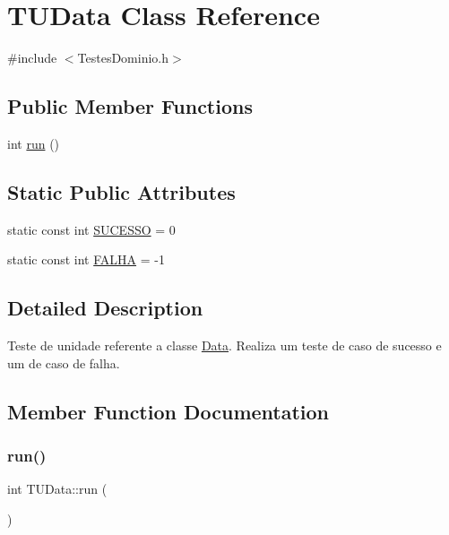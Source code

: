 \hypertarget{class_t_u_data}{}\section{T\+U\+Data Class Reference}
\label{class_t_u_data}


{\ttfamily \#include $<$Testes\+Dominio.\+h$>$}

\subsection*{Public Member Functions}
\begin{DoxyCompactItemize}
\item 
int \hyperlink{class_t_u_data_a4fd95b821fa6d55bdc82be6f3a3cbef2}{run} ()
\end{DoxyCompactItemize}
\subsection*{Static Public Attributes}
\begin{DoxyCompactItemize}
\item 
static const int \hyperlink{class_t_u_data_a59be2c38007b733030111a5aadfb4517}{S\+U\+C\+E\+S\+SO} = 0
\item 
static const int \hyperlink{class_t_u_data_a691cfac8c7fc4b3da149ef868de44f35}{F\+A\+L\+HA} = -\/1
\end{DoxyCompactItemize}


\subsection{Detailed Description}
Teste de unidade referente a classe \hyperlink{class_data}{Data}. Realiza um teste de caso de sucesso e um de caso de falha. 

\subsection{Member Function Documentation}
\mbox{\label{class_t_u_data_a4fd95b821fa6d55bdc82be6f3a3cbef2}} 
\subsubsection{\texorpdfstring{run()}{run()}}
{\footnotesize\ttfamily int T\+U\+Data\+::run (\begin{DoxyParamCaption}{ }\end{DoxyParamCaption})}



